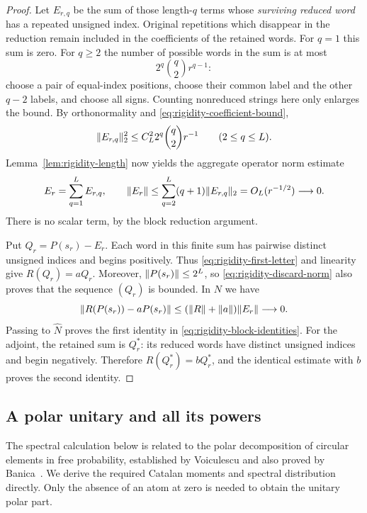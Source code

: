 \begin{proof}
Let $E_{r,q}$ be the sum of those length-$q$ terms whose \emph{surviving
reduced word} has a repeated unsigned index.  Original repetitions
which disappear in the reduction remain included in the coefficients
of the retained words.  For $q=1$ this sum is zero.  For $q\geq2$ the
number of possible words in the sum is at most
\[
 2^q\binom q2 r^{q-1}:
\]
choose a pair of equal-index positions, choose their common label and
the other $q-2$ labels, and choose all signs.  Counting nonreduced
strings here only enlarges the bound.  By orthonormality and
\eqref{eq:rigidity-coefficient-bound},
\begin{equation}\label{eq:rigidity-discard-ltwo}
 \lVert E_{r,q}\rVert_2^2
 \leq C_L^2 2^q\binom q2 r^{-1}\qquad(2\leq q\leq L).
\end{equation}
Lemma~\ref{lem:rigidity-length} now yields the aggregate operator norm
estimate
\begin{equation}\label{eq:rigidity-discard-norm}
 E_r=\sum_{q=1}^L E_{r,q},\qquad
 \lVert E_r\rVert\leq\sum_{q=2}^L(q+1)\lVert E_{r,q}\rVert_2
 =O_L(r^{-1/2})\longrightarrow0.
\end{equation}
There is no scalar term, by the block reduction argument.

Put $Q_r=P(s_r)-E_r$.  Each word in this finite sum has pairwise
distinct unsigned indices and begins positively.  Thus
\eqref{eq:rigidity-first-letter} and linearity give $R(Q_r)=aQ_r$.
Moreover, $\lVert P(s_r)\rVert\leq2^L$, so \eqref{eq:rigidity-discard-norm}
also proves that the sequence $(Q_r)$ is bounded.  In $N$ we have
\[
 \lVert R(P(s_r))-aP(s_r)\rVert
 \leq(\lVert R\rVert+\lVert a\rVert)\lVert E_r\rVert\longrightarrow0.
\]
Passing to $\widehat N$ proves the first identity in
\eqref{eq:rigidity-block-identities}.  For the adjoint, the retained
sum is $Q_r^*$: its reduced words have distinct unsigned indices and
begin negatively.  Therefore $R(Q_r^*)=bQ_r^*$, and the identical
estimate with $b$ proves the second identity.
\end{proof}

\subsection{A polar unitary and all its powers}

The spectral calculation below is related to the polar decomposition
of circular elements in free probability, established by Voiculescu
and also proved by Banica~\cite{Voiculescu1990Circular,Banica1996Polar}.
We derive the required Catalan moments and spectral distribution
directly. Only the absence of an atom at zero is needed to obtain
the unitary polar part.

